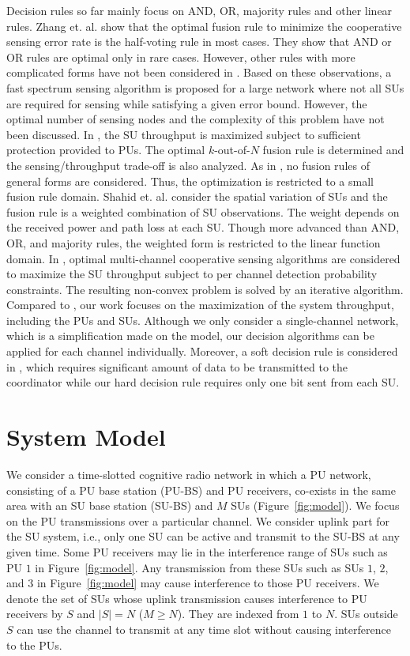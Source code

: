 \documentclass[conference]{IEEEtran}
\begin{document}
Decision rules so far mainly focus on AND, OR, majority rules and other linear rules. Zhang et. al. \cite{4533677} show that the optimal fusion rule to minimize the cooperative sensing error rate is the half-voting rule in most cases. They show that AND or OR 
rules are optimal only in rare cases. However, other rules with more 
complicated forms have not been considered in \cite{4533677}. Based on these observations, a fast spectrum sensing algorithm is proposed for a large network where not all SUs are required for sensing while satisfying a given error bound. However, the optimal number of sensing nodes and the complexity of this problem have not been discussed. In \cite{5169958}, the SU throughput is maximized subject to sufficient protection provided to PUs. The optimal $k$-out-of-$N$ fusion rule is determined and the sensing/throughput trade-off is also analyzed. As in \cite{4533677}, no fusion rules of general forms are considered. Thus, the optimization is restricted to a small fusion rule domain. Shahid et. al. \cite{Shahid_Kamruzzaman_2010} consider the spatial variation of SUs and the fusion rule is a weighted combination of SU observations. The weight depends on the received power and path loss at each SU. Though more advanced than AND, OR, and majority rules, the weighted form is restricted to the linear function domain. In \cite{Fan_Jiang_2010}, optimal multi-channel cooperative sensing algorithms are considered to maximize the SU throughput subject to per channel detection probability constraints. The resulting non-convex problem is solved by an iterative algorithm. Compared to \cite{Fan_Jiang_2010}, our work focuses on the maximization of the system throughput, including the PUs and SUs. Although we only consider a single-channel network, which is a simplification made on the model, our decision algorithms can be applied for each channel individually. Moreover, a soft decision rule is considered in \cite{Fan_Jiang_2010}, which requires significant amount of data to be transmitted to the coordinator while our hard decision rule requires only one bit sent from each SU. 

\section{System Model}
\label{sec:model}
We consider a time-slotted cognitive radio network in which a PU network, consisting of a PU base station (PU-BS) and PU receivers, co-exists in the same area with an SU base station (SU-BS) and $M$ SUs (Figure~\ref{fig:model}). We focus on the PU transmissions over a particular channel. We consider uplink part for the SU system, i.e., only one SU can be active and transmit to the SU-BS at any given time. Some PU receivers may lie in the interference range of SUs such as PU $1$ in Figure~\ref{fig:model}. Any transmission from these SUs such as SUs $1$, $2$, and $3$ in Figure~\ref{fig:model} may cause interference to those PU receivers. We denote the set of SUs whose uplink transmission causes interference to PU receivers by $S$ and $|S|=N$ ($M\ge N$). They are indexed from $1$ to $N$. SUs outside $S$ can use the channel to transmit at any time slot without causing interference to the PUs.     
\end{document}
